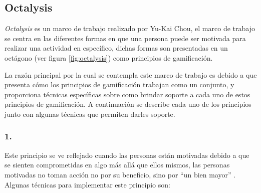 \subsection{Octalysis}
\label{sec:octalysis}

 {\it Octalysis} es un marco de trabajo realizado por Yu-Kai Chou, el marco de trabajo
 se centra en las diferentes formas en que una persona puede ser motivada para realizar
 una actividad en específico, dichas formas son presentadas en un octágono (ver figura
 \ref{fig:octalysis}) como principios de gamificación.\\



 \noindent La razón principal por la cual se contempla este marco de trabajo es debido a que presenta
 cómo los principios de gamificación trabajan como un conjunto, y proporciona técnicas específicas
 sobre como brindar soporte a cada uno de estos principios de gamificación. A continuación se
 describe cada uno de los principios junto con algunas técnicas que permiten darles soporte.

\subsubsection{1. \principioI} \label{subsec:principioI}

 Este principio se ve reflejado cuando las personas están motivadas debido a que se
 sienten comprometidas en algo más allá que ellos mismos, las personas motivadas no toman acción
 no por su beneficio, sino por ``un bien mayor'' \cite[p. 66, 69]{Octalysis}. Algunas técnicas
 para implementar este principio son:

